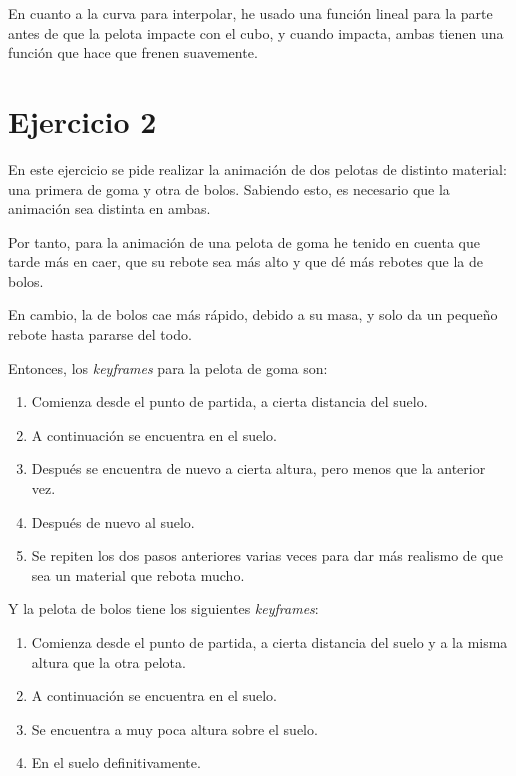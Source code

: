 \documentclass{article}
\begin{document}
En cuanto a la curva para interpolar, he usado una función lineal para la parte antes de que la pelota impacte con el cubo, y cuando impacta, ambas tienen una función que hace que frenen suavemente.



\section{Ejercicio 2}

En este ejercicio se pide realizar la animación de dos pelotas de distinto material: una primera de goma y otra de bolos. Sabiendo esto, es necesario que la animación sea distinta en ambas.

Por tanto, para la animación de una pelota de goma he tenido en cuenta que tarde más en caer, que su rebote sea más alto y que dé más rebotes que la de bolos.

En cambio, la de bolos cae más rápido, debido a su masa, y solo da un pequeño rebote hasta pararse del todo.


Entonces, los \textit{keyframes} para la pelota de goma son:

\begin{enumerate}
    \item Comienza desde el punto de partida, a cierta distancia del suelo.
    \item A continuación se encuentra en el suelo.
    \item Después se encuentra de nuevo a cierta altura, pero menos que la anterior vez.
    \item Después de nuevo al suelo.
    \item Se repiten los dos pasos anteriores varias veces para dar más realismo de que sea un material que rebota mucho.
\end{enumerate}


Y la pelota de bolos tiene los siguientes \textit{keyframes}:

\begin{enumerate}
    \item Comienza desde el punto de partida, a cierta distancia del suelo y a la misma altura que la otra pelota.
    \item A continuación se encuentra en el suelo.
    \item Se encuentra a muy poca altura sobre el suelo.
    \item En el suelo definitivamente.
\end{enumerate}
\end{document}
